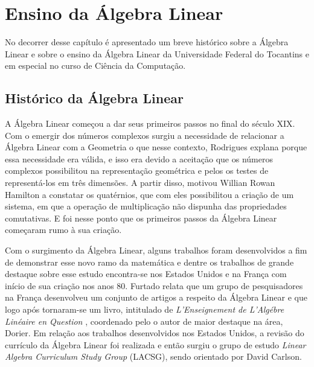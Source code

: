 \chapter{Ensino da Álgebra Linear}
\label{cap:algebra}

\noindent No decorrer desse capítulo é apresentado um breve histórico sobre a Álgebra Linear e sobre o ensino da Álgebra Linear da Universidade Federal do Tocantins e em especial no curso de Ciência da Computação.

\section{Histórico da Álgebra Linear}

\noindent A Álgebra Linear começou a dar seus primeiros passos no final do século XIX. Com o emergir dos números complexos surgiu a necessidade de relacionar a Álgebra Linear com a Geometria o que nesse contexto, Rodrigues \cite{2009:Rodrigues} explana porque essa necessidade era válida, e isso era devido a aceitação que os números complexos possibilitou na representação geométrica e pelos os testes de representá-los em três dimensões. A partir disso, motivou Willian Rowan Hamilton a constatar os quatérnios, que com eles possibilitou a criação de um sistema, em que a operação de multiplicação não dispunha das propriedades comutativas. E foi nesse ponto que os primeiros passos da Álgebra Linear começaram rumo à sua criação.

Com o surgimento da Álgebra Linear, alguns trabalhos foram desenvolvidos a fim de demonstrar esse novo ramo da matemática e dentre os trabalhos de grande destaque sobre esse estudo encontra-se nos Estados Unidos e na França com início de sua criação nos anos 80. Furtado \cite{2011:Furtado} relata que um grupo de pesquisadores na França desenvolveu um conjunto de artigos a respeito da Álgebra Linear e que logo após tornaram-se um livro, intitulado de \textit{L'Enseignement de L'Algébre Linéaire en Question} \cite{1998:dirier}, coordenado pelo o autor de maior destaque na área, Dorier. Em relação aos trabalhos desenvolvidos nos Estados Unidos, a revisão do currículo da Álgebra Linear foi realizada e então surgiu o grupo de estudo \textit{Linear Algebra Curriculum Study Group} (LACSG), sendo orientado por David Carlson. 

